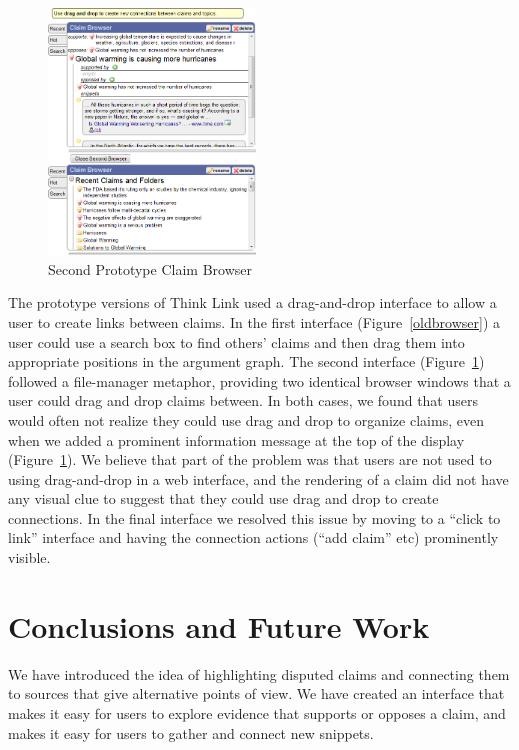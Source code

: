 \documentclass{chi2009}
\begin{document}
\begin{figure}[tb]
\begin{center}
	\includegraphics[width=5.5cm]{../screenshots/claimbrowse.png}
	\caption{Second Prototype Claim Browser}
	\label{secondbrowser}
\end{center}
\end{figure}

The prototype versions of Think Link used a drag-and-drop interface to allow a user to create links between claims. In the first interface (Figure~\ref{oldbrowser}) a user could use a search box to find others' claims and then drag them into appropriate positions in the argument graph. The second interface (Figure~\ref{secondbrowser}) followed a file-manager metaphor, providing two identical browser windows that a user could drag and drop claims between. 
In both cases, we found that users would often not realize they could use drag and drop to organize claims, even when we added a prominent information message at the top of the display (Figure~\ref{secondbrowser}). We believe that part of the problem was that users are not used to using drag-and-drop in a web interface, and the rendering of a claim did not have any visual clue to suggest that they could use drag and drop to create connections. In the final interface we resolved this issue by moving to a ``click to link'' interface and having the connection actions (``add claim'' etc) prominently visible.

\section{Conclusions and Future Work}

We have introduced the idea of highlighting disputed claims and connecting them to sources that give alternative points of view. We have created an interface that makes it easy for users to explore evidence that supports or opposes a claim, and makes it easy for users to gather and connect new snippets. 
\end{document}
